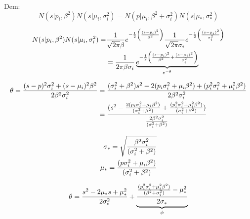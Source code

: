 \documentclass[11pt,twoside,spanish]{report} %
\begin{document}
Dem:
\begin{equation}N(s \vert p_i,\beta^2) N(s \vert \mu_i,\sigma_i^2) = N(p \vert \mu_i,\beta^2+\sigma_i^2) N(s \vert \mu_{\ast},\sigma_{\ast}^2)
\end{equation}

\begin{equation}
	\centering
	\begin{split}
		N(s \vert p_i,\beta^2) N(s \vert \mu_i,\sigma_i^2) =
		& \frac{1}{\sqrt{2\pi} \beta}e^{-\frac{1}{2}\left(\frac{(s-p_i)^2}{\beta^2}\right)}\frac{1}{\sqrt{2\pi} \sigma_i}e^{-\frac{1}{2}\left(\frac{(s-\mu_i)^2}{\sigma_i^2}\right)} \\
		& = \frac{1}{2\pi\beta\sigma_i}\underbrace{e^{-\frac{1}{2}\left(\frac{(s-p_i)^2}{\beta^2}+\frac{(s-\mu_i)^2}{\sigma_i^2}\right)}}_{e^{-\theta}}
	\end{split}
\end{equation}

\begin{equation}
	\centering
	\begin{split}
		\theta = \frac{(s-p)^2\sigma_{i}^2+(s-\mu_i)^2\beta^2}{2\beta^2\sigma_i^2}
		& = \frac{(\sigma_i^2+\beta^2)s^2-2(p_i\sigma_i^2+\mu_i\beta^2)+(p_i^2\sigma_{i}^2+\mu_{i}^2\beta^2)}{2\beta^2\sigma_{i}^2} \\
		& =\frac{(s^2-\frac{2(p_i\sigma_{i}^2+\mu_i\beta^2)}{(\sigma_{i}^2+\beta^2)}+\frac{(p_{i}^2\sigma_{i}^2+\mu_{i}^2\beta^2)}{(\sigma_i^2+\beta^2)})}{\frac{2\beta^2\sigma_{i}^2}{(\sigma_{i}^2+\beta^2)}}
	\end{split}
\end{equation}


\begin{equation}
	\centering
	\begin{split}
		\sigma_{\ast}=\sqrt{\frac{\beta^2\sigma_i^2}{(\sigma_i^2+\beta^2)}}\\
		\mu_{\ast}=\frac{(p\sigma_i^2+\mu_i\beta^2)}{(\sigma_i^2+\beta^2)}
	\end{split}
\end{equation}

\begin{equation}
	\centering
	\begin{split}
		\theta =\frac{s^2-2\mu_{\ast}s+\mu_{\ast}^2}{2\sigma_{\ast}^2} + \underbrace{\frac{\frac{(p_i^2\sigma_i^2+\mu_i^2\beta^2)}{(\beta^2+\sigma_i^2)}-\mu_{\ast}^2}{2\sigma_{\ast}}}_{\phi}
	\end{split}
\end{equation}
\end{document}
